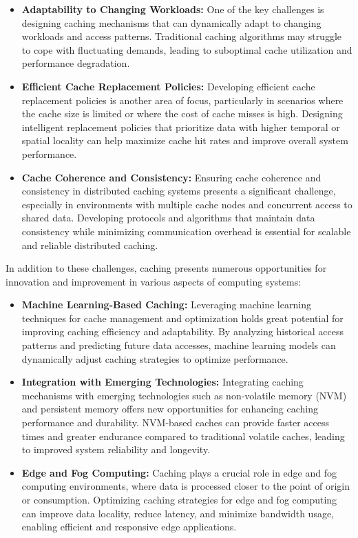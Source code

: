 \documentclass[12pt]{book} %
\begin{document}
\begin{itemize}
    \item \textbf{Adaptability to Changing Workloads:} One of the key challenges is designing caching mechanisms that can dynamically adapt to changing workloads and access patterns. Traditional caching algorithms may struggle to cope with fluctuating demands, leading to suboptimal cache utilization and performance degradation.
    
    \item \textbf{Efficient Cache Replacement Policies:} Developing efficient cache replacement policies is another area of focus, particularly in scenarios where the cache size is limited or where the cost of cache misses is high. Designing intelligent replacement policies that prioritize data with higher temporal or spatial locality can help maximize cache hit rates and improve overall system performance.
    
    \item \textbf{Cache Coherence and Consistency:} Ensuring cache coherence and consistency in distributed caching systems presents a significant challenge, especially in environments with multiple cache nodes and concurrent access to shared data. Developing protocols and algorithms that maintain data consistency while minimizing communication overhead is essential for scalable and reliable distributed caching.
\end{itemize}

In addition to these challenges, caching presents numerous opportunities for innovation and improvement in various aspects of computing systems:

\begin{itemize}
    \item \textbf{Machine Learning-Based Caching:} Leveraging machine learning techniques for cache management and optimization holds great potential for improving caching efficiency and adaptability. By analyzing historical access patterns and predicting future data accesses, machine learning models can dynamically adjust caching strategies to optimize performance.
    
    \item \textbf{Integration with Emerging Technologies:} Integrating caching mechanisms with emerging technologies such as non-volatile memory (NVM) and persistent memory offers new opportunities for enhancing caching performance and durability. NVM-based caches can provide faster access times and greater endurance compared to traditional volatile caches, leading to improved system reliability and longevity.
    
    \item \textbf{Edge and Fog Computing:} Caching plays a crucial role in edge and fog computing environments, where data is processed closer to the point of origin or consumption. Optimizing caching strategies for edge and fog computing can improve data locality, reduce latency, and minimize bandwidth usage, enabling efficient and responsive edge applications.
\end{itemize}
\end{document}
